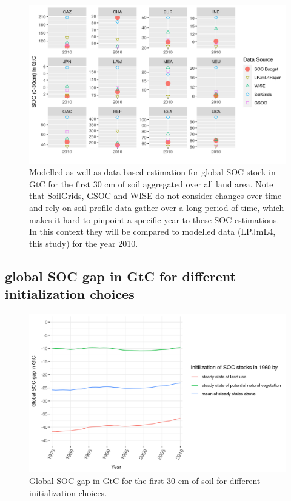 \documentclass[gc, manuscript]{copernicus}
\begin{document}
\begin{figure}[H]
\includegraphics[width=1\linewidth]{../ResultNotebooks/Output/Images/reg_comparisonfigure} \caption{Modelled as well as data based estimation for global SOC stock in GtC for the first 30 cm of soil aggregated over all land area. Note that SoilGrids, GSOC and WISE do not consider changes over time and rely on soil profile data gather over a long period of time, which makes it hard to pinpoint a specific year to these SOC estimations. In this context they will be compared to modelled data (LPJmL4, this study) for the year 2010.}\label{fig:regSOCtable}
\end{figure}

\hypertarget{append:initcompare}{%
\subsection{global SOC gap in GtC for different initialization choices}\label{append:initcompare}}

\begin{figure}[H]
\includegraphics[width=1\linewidth]{../ResultNotebooks/Output/Images/scenario_lu} \caption{Global SOC gap in GtC for the first 30 cm of soil for different initialization choices.}\label{fig:initSOC}
\end{figure}
\end{document}
